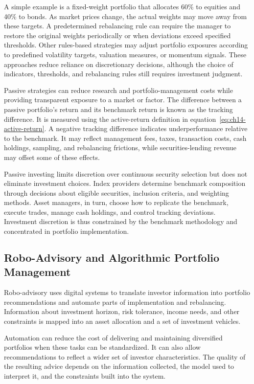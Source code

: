A simple example is a fixed-weight portfolio that allocates
60\% to equities and 40\% to bonds. As market prices change,
the actual weights may move away from these targets. A
predetermined rebalancing rule can require the manager to
restore the original weights periodically or when deviations
exceed specified thresholds. Other rules-based strategies
may adjust portfolio exposures according to predefined
volatility targets, valuation measures, or momentum signals.
These approaches reduce reliance on discretionary decisions,
although the choice of indicators, thresholds, and rebalancing rules still requires investment judgment.

Passive strategies can reduce research and portfolio-management
costs while providing transparent exposure to a market or
factor. The difference between a passive portfolio's return
and its benchmark return is known as the tracking difference.
It is measured using the active-return definition in
equation~\eqref{eq:ch14-active-return}. A negative tracking
difference indicates underperformance relative to the
benchmark. It may reflect management fees, taxes, transaction
costs, cash holdings, sampling, and rebalancing frictions,
while securities-lending revenue may offset some of these
effects.

Passive investing limits discretion over continuous security
selection but does not eliminate investment choices. Index
providers determine benchmark composition through decisions
about eligible securities, inclusion criteria, and weighting
methods. Asset managers, in turn, choose how to replicate
the benchmark, execute trades, manage cash holdings, and
control tracking deviations. Investment discretion is thus
constrained by the benchmark methodology and concentrated
in portfolio implementation.

\subsection{Robo-Advisory and Algorithmic Portfolio Management}

Robo-advisory uses digital systems to translate investor information into portfolio recommendations and automate parts of implementation and rebalancing. Information about investment horizon, risk tolerance, income needs, and other constraints is mapped into an asset allocation and a set of investment vehicles.

Automation can reduce the cost of delivering and maintaining diversified portfolios when these tasks can be standardized. It can also allow recommendations to reflect a wider set of investor characteristics. The quality of the resulting advice depends on the information collected, the model used to interpret it, and the constraints built into the system.

